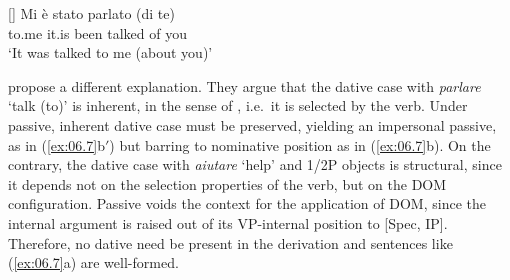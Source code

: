 \documentclass[output=paper]{langsci/langscibook}
\begin{document}
\ea%
\label{ex:06.7} 
    []{
	\gll    Mi   è   stato parlato (di te)\\
            to.me  it.is  been talked \hphantom{(}of you\\
    \glt    ‘It was talked to me (about you)’}
    \z
\z

\citet{ManFra2016} propose a different explanation. They argue that the dative
case with \emph{parlare} ‘talk (to)’ is inherent, in the sense of
\citet{Chomsky1986}, i.e.\ it is selected by the verb. Under passive, inherent
dative case must be preserved, yielding an impersonal passive, as in
(\ref{ex:06.7}b$'$) but barring  to nominative
position as in (\ref{ex:06.7}b). On the contrary, the dative case with
\emph{aiutare} ‘help’ and 1/2P objects is structural, since it depends not on
the selection properties of the verb, but on the DOM configuration. Passive
voids the context for the application of DOM, since the internal argument is
raised out of its VP-internal position to [Spec, IP].  Therefore, no dative
need be present in the derivation and sentences like (\ref{ex:06.7}a) are
well-formed.
\end{document}
